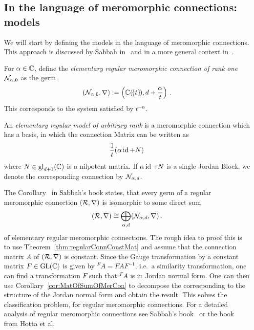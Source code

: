 \subsection{In the language of meromorphic connections: models}
We will start by defining the models in the language of meromorphic connections.
This approach is discussed by Sabbah in~\cite{sabbah_cimpa90} and in a more
general context in~\cite[Sec.II.5]{sabbah2007isomonodromic}.
\begin{defn}\label{defn:elemnMerConnBausteine}
  For $\alpha\in\mathbb{C}$, define the \emph{elementary regular meromorphic
    connection of rank one} $\mathcal{N}_{\alpha,0}$ as the germ
  \[
    (\mathcal{N}_{\alpha,0},\nabla):=\left(\mathbb{C}(\!\{t\}\!),d+\frac{\alpha}{t}\right)
    \,.
  \]
  This corresponds to the system satisfied by $t^{-\alpha}$.

  An \emph{elementary regular model of arbitrary rank} is a meromorphic
  connection which has a basis, in which the connection Matrix can be
  written as
  \[
    \frac{1}{t} (\alpha\operatorname{id}+N)
  \]
  where $N\in\operatorname{gl}_{d+1}(\mathbb{C})$ is a nilpotent matrix.
  If $\alpha\operatorname{id} + N$ is a single Jordan Block, we denote the corresponding
  connection by $\mathcal{N}_{\alpha,d}$.
\end{defn}
The Corollary~\cite[Cor.II.2.9]{sabbah2007isomonodromic} in Sabbah's book
states, that every germ of a regular meromorphic connection $(\mathcal{R},\nabla)$ is
isomorphic to some direct sum
\[
  (\mathcal{R},\nabla)\cong\bigoplus_{\alpha,d}(\mathcal{N}_{\alpha,d},\nabla)\,.
\]
of elementary regular meromorphic connections.
The rough idea to proof this is to use Theorem~\ref{thm:regularConnConstMat}
and assume that the connection matrix $A$ of $(\mathcal{R},\nabla)$ is constant.
Since the Gauge transformation by a constant matrix $F\in\operatorname{GL}(\mathbb{C})$ is given by
${}^F\!A=FAF^{-1}$, i.e.\ a similarity transformation, one can find a
transformation $F$ such that ${}^F\!A$ is in Jordan normal form.
One can then use Corollary~\ref{cor:MatOfSumOfMerCon} to decompose the
corresponding to the structure of the Jordan normal form and obtain the result.
This solves the classification problem, for regular meromorphic connections.
For a detailed analysis of regular meromorphic connections see Sabbah's
book~\cite[Sec.II.2]{sabbah2007isomonodromic} or the
book~\cite[Sec.5.2]{hotta2008} from Hotta et al.

